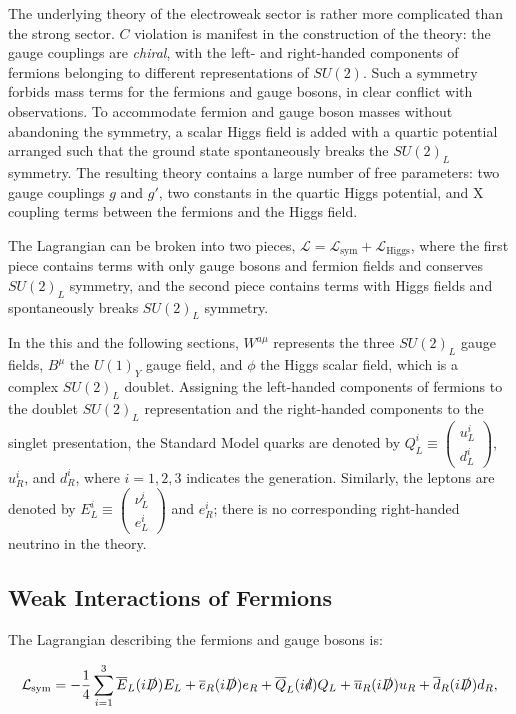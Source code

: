 The underlying theory of the electroweak sector is rather more complicated than the strong sector. $C$ violation is manifest in the construction of the theory: the gauge couplings are \emph{chiral}, with the left- and right-handed components of fermions belonging to different representations of $SU(2)$. Such a symmetry forbids mass terms for the fermions and gauge bosons, in clear conflict with observations. To accommodate fermion and gauge boson masses without abandoning the symmetry, a scalar Higgs field is added with a quartic potential arranged such that the ground state spontaneously breaks the $SU(2)_L$ symmetry. The resulting theory contains a large number of free parameters: two gauge couplings $g$ and $g'$, two constants in the quartic Higgs potential, and X coupling terms between the fermions and the Higgs field.

The Lagrangian can be broken into two pieces, $\mathcal{L} = \mathcal{L}_{\mathrm{sym}} + \mathcal{L}_{\mathrm{Higgs}}$, where the first piece contains terms with only gauge bosons and fermion fields and conserves $SU(2)_L$ symmetry, and the second piece contains terms with Higgs fields and spontaneously breaks $SU(2)_L$ symmetry. 

In the this and the following sections, $W^{a\mu}$ represents the three $SU(2)_L$ gauge fields, $B^{\mu}$ the $U(1)_Y$ gauge field, and $\phi$ the Higgs scalar field, which is a complex $SU(2)_L$ doublet. Assigning the left-handed components of fermions to the doublet $SU(2)_L$ representation and the right-handed components to the singlet presentation, the Standard Model quarks are denoted by $Q_L^i\equiv \left(\begin{array}{c} u^i_L \\ d^i_L \end{array}\right)$, $u_R^i$, and $d_R^i$, where $i=1,2,3$ indicates the generation. Similarly, the leptons are denoted by $E_L^i\equiv \left(\begin{array}{c} \nu_L^i \\ e_L^i \end{array}\right)$ and $e_R^i$; there is no corresponding right-handed neutrino in the theory. 

\subsection{Weak Interactions of Fermions}
The Lagrangian describing the fermions and gauge bosons is:

\begin{equation}\label{eqn:electroweak-lagrangian}
	\mathcal{L}_{\mathrm{sym}} =  -\frac{1}{4} \sum_{i=1}^3  \overline{E}_L (i\slashed{D}) E_L + \overline{e}_R(i\slashed{D})e_R + \overline{Q}_L(i\slashed{d})Q_L + \overline{u}_R(i\slashed{D})u_R+\overline{d}_R(i\slashed{D})d_R,
\end{equation}

